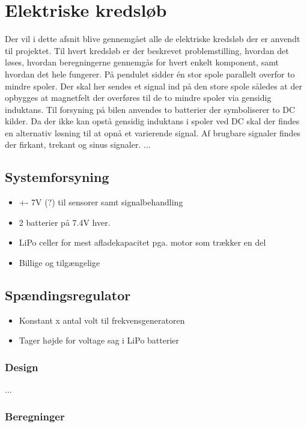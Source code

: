 
\section{Elektriske kredsløb}\label{sec:sec_sparningsreg}
Der vil i dette afsnit blive gennemgået alle de elektriske kredsløb der er anvendt til projektet. 
Til hvert kredsløb er der beskrevet problemstilling, hvordan det løses, hvordan beregningerne gennemgås for hvert enkelt komponent, samt hvordan det hele fungerer.
På pendulet sidder én stor spole parallelt overfor to mindre spoler. 
Der skal her sendes et signal ind på den store spole således at der opbygges at magnetfelt der overføres til de to mindre spoler via gensidig induktans. 
Til forsyning på bilen anvendes to batterier der symboliserer to DC kilder. 
Da der ikke kan opstå gensidig induktans i spoler ved DC skal der findes en alternativ løsning til at opnå et varierende signal. 
Af brugbare signaler findes der firkant, trekant og sinus signaler.
...
\subsection{Systemforsyning}
\begin{itemize}
	\item +- 7V (?) til sensorer samt signalbehandling
	\item 2 batterier på 7.4V hver. 
	\item LiPo celler for mest afladekapacitet pga. motor som trækker en del
	\item Billige og tilgængelige
\end{itemize}
\subsection{Spændingsregulator}

\begin{itemize}
	\item Konstant x antal volt til frekvensgeneratoren
	\item Tager højde for voltage sag i LiPo batterier
\end{itemize}

	
	\subsubsection{Design}
	...
	
	\subsubsection{Beregninger}
	
